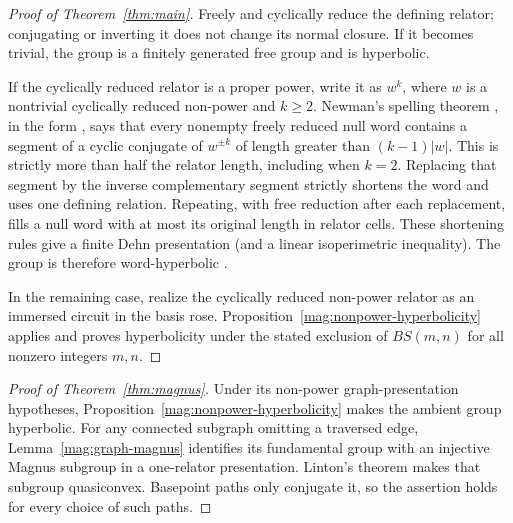 \begin{proof}[Proof of Theorem~\ref{thm:main}]
Freely and cyclically reduce the defining relator; conjugating or
inverting it does not change its normal closure.
If it becomes trivial, the group is a finitely generated free
group and is hyperbolic.

If the cyclically reduced relator is a proper power, write it as
$w^k$, where $w$ is a nontrivial cyclically reduced non-power and
$k\geq2$.  Newman's spelling theorem
\cite{Newman1968}, in the form
\cite[Theorem~4]{McCoolSchupp1973}, says that every nonempty
freely reduced null word contains a segment of a cyclic conjugate
of $w^{\pm k}$ of length greater than $(k-1)|w|$.
This is strictly more than half the relator length, including
when $k=2$.  Replacing that segment by the inverse complementary
segment strictly shortens the word and uses one defining
relation.  Repeating, with free reduction after each replacement,
fills a null word with at most its original length in relator
cells.  These shortening rules give a finite Dehn presentation
(and a linear isoperimetric inequality).  The group is therefore
word-hyperbolic
\cite[Theorem~III.$\Gamma$.2.6]{BridsonHaefliger1999}.

In the remaining case, realize the cyclically reduced non-power
relator as an immersed circuit in the basis rose.
Proposition~\ref{mag:nonpower-hyperbolicity} applies and proves
hyperbolicity under the stated exclusion of $BS(m,n)$ for all
nonzero integers $m,n$.
\end{proof}

\begin{proof}[Proof of Theorem~\ref{thm:magnus}]
Under its non-power graph-presentation hypotheses,
Proposition~\ref{mag:nonpower-hyperbolicity} makes the ambient
group hyperbolic.  For any connected subgraph omitting a
traversed edge, Lemma~\ref{mag:graph-magnus} identifies its
fundamental group with an injective Magnus subgroup in a
one-relator presentation.  Linton's theorem
\cite[Theorem~4.7]{LintonHyperbolic2026} makes that subgroup
quasiconvex.  Basepoint paths only conjugate it, so the assertion
holds for every choice of such paths.
\end{proof}
